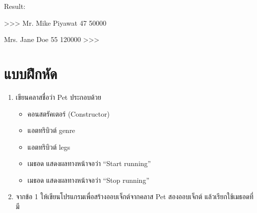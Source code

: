 Result:
\begin{pycode}
>>>
Mr. Mike Piyawat
47
50000


Mrs. Jane Doe
55
120000
>>> 
\end{pycode}


\section{แบบฝึกหัด}
\begin{enumerate} 
\item 	เขียนคลาสชื่อว่า Pet ประกอบด้วย
	\begin{itemize}
	\item 	คอนสตรัคเตอร์ (Constructor)
	\item 	แอตทริบิวต์ genre
	\item 	แอตทริบิวต์ legs
	\item 	เมธอด  แสดงผลทางหน้าจอว่า “Start running”
	\item 	เมธอด  แสดงผลทางหน้าจอว่า “Stop running”
	\end{itemize}
\item 	 จากข้อ 1 ให้เขียนโปรแกรมเพื่อสร้างออบเจ็กต์จากคลาส Pet สองออบเจ็กต์ แล้วเรียกใช้เมธอดที่มี
\end{enumerate}